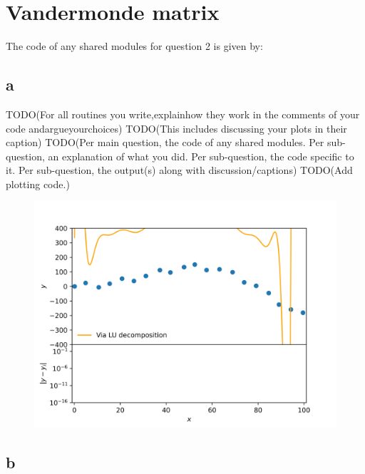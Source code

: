 \section{Vandermonde matrix}

The code of any shared modules for question 2 is given by:


\subsection{a}

TODO(For all routines you write,explainhow they work in the comments of your code andargueyourchoices)
TODO(This includes discussing your plots in their caption)
TODO(Per main question, the code of any shared modules. Per sub-question, an explanation of what you did. Per sub-question, the code specific to it. Per sub-question, the output(s) along with discussion/captions)
TODO(Add plotting code.)






\begin{figure}[h!]
    \centering
    \includegraphics[width=0.9\linewidth]{./my_vandermonde_sol_2a.png}
    \caption{}
    \label{fig:2a}
\end{figure}

\subsection{b}


